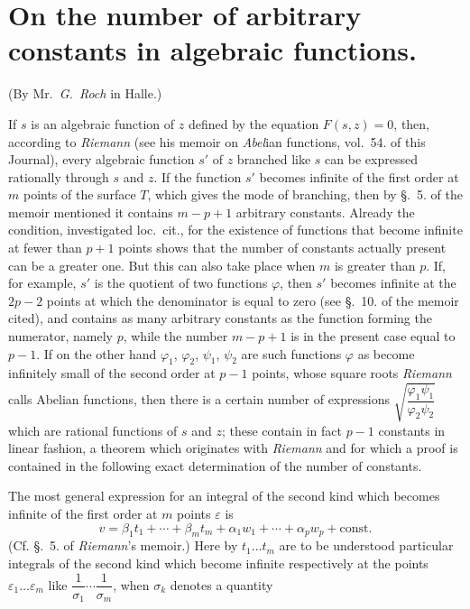\documentclass{article}
\begin{document}
\section*{On the number of arbitrary constants in algebraic functions.}

(By Mr.~\emph{G.~Roch} in Halle.)

If $s$ is an algebraic function of $z$ defined by the equation $F(s, z) = 0$, then, according to \emph{Riemann} (see his memoir on \emph{Abel}ian functions, vol.~54. of this Journal), every algebraic function $s'$ of $z$ branched like $s$ can be expressed rationally through $s$ and $z$. If the function $s'$ becomes infinite of the first order at $m$ points of the surface $T$, which gives the mode of branching, then by §.~5. of the memoir mentioned it contains $m-p+1$ arbitrary constants. Already the condition, investigated loc.~cit., for the existence of functions that become infinite at fewer than $p+1$ points shows that the number of constants actually present can be a greater one. But this can also take place when $m$ is greater than $p$. If, for example, $s'$ is the quotient of two functions $\varphi$, then $s'$ becomes infinite at the $2p-2$ points at which the denominator is equal to zero (see §.~10. of the memoir cited), and contains as many arbitrary constants as the function forming the numerator, namely $p$, while the number $m-p+1$ is in the present case equal to $p-1$. If on the other hand $\varphi_{1}$, $\varphi_{2}$, $\psi_{1}$, $\psi_{2}$ are such functions $\varphi$ as become infinitely small of the second order at $p-1$ points, whose square roots \emph{Riemann} calls Abelian functions, then there is a certain number of expressions $\sqrt{\dfrac{\varphi_{1}\psi_{1}}{\varphi_{2}\psi_{2}}}$ which are rational functions of $s$ and $z$; these contain in fact $p-1$ constants in linear fashion, a theorem which originates with \emph{Riemann} and for which a proof is contained in the following exact determination of the number of constants.

The most general expression for an integral of the second kind which becomes infinite of the first order at $m$ points $\varepsilon$ is
\[ v = \beta_{1} t_{1} + \cdots + \beta_{m} t_{m} + \alpha_{1} w_{1} + \cdots + \alpha_{p} w_{p} + \text{const.} \]
(Cf. §.~5. of \emph{Riemann}'s memoir.) Here by $t_{1} \ldots t_{m}$ are to be understood particular integrals of the second kind which become infinite respectively at the points $\varepsilon_{1} \ldots \varepsilon_{m}$ like $\dfrac{1}{\sigma_{1}} \cdots \dfrac{1}{\sigma_{m}}$, when $\sigma_{k}$ denotes a quantity
\end{document}
